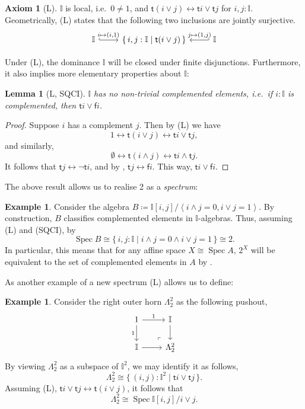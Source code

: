 \documentclass[a4paper,12pt]{amsart}
\newtheorem{lemma}[theorem]{Lemma}
\theoremstyle{definition}
\newtheorem{example}[theorem]{Example}
\newtheorem*{axiom}{Axiom}
\newcommand{\mbb}[1]{\mathbb{#1}}
\newcommand{\I}{\mbb I}
\newcommand{\ms}[1]{\mathsf{#1}}
\newcommand{\pair}[1]{\left\langle#1\right\rangle}
\newcommand{\scomp}[2]{\{\,#1\mid#2\,\}}
\newcommand{\emp}{\emptyset}
\newcommand{\eq}{\leftrightarrow}
\newcommand{\spec}{\operatorname{Spec}}
\begin{document}
\begin{axiom}[L]\label{ax:L}
  $\I$ is local, i.e.\ $0 \neq 1$, and $\ms t(i\vee j) \eq \ms ti \vee \ms tj$ for $i,j : \I$. Geometrically, (L) states that the following two inclusions are jointly surjective.
  \[ 
  \begin{tikzcd}
    \I \ar[r, hook, "{i \mapsto (i,1)}"] & \scomp{i,j : \I}{\ms t(i\vee j)} & \I \ar[l, hook', "{j \mapsto (1,j)}"']
  \end{tikzcd}
  \]
\end{axiom}

Under (L), the dominance $\I$ will be closed under finite disjunctions. Furthermore, it also implies more elementary properties about $\I$:

\begin{lemma}[L, SQCI]\label{lem:intisnotBoolean}
  $\I$ has no non-trivial complemented elements, i.e.\ if $i : \I$ is complemented, then $\ms ti \vee \ms fi$. 
\end{lemma}
\begin{proof}
  Suppose $i$ has a complement $j$. Then by (L) we have
  \[ 1 \eq \ms t(i \vee j) \eq \ms ti \vee \ms tj, \]
  and similarly,
  \[ \emp \eq \ms t(i \wedge j) \eq \ms ti \wedge \ms tj. \]
  It follows that $\ms tj \eq \neg \ms ti$, and by , $\ms tj \eq \ms fi$. This way, $\ms ti \vee \ms fi$.
\end{proof}

The above result allows us to realise 2 as a \emph{spectrum}:

\begin{example}\label{exm:2isaffine}
  Consider the algebra $B \coloneq \I[i,j]/\pair{i\wedge j =0,i\vee j = 1}$. By construction, $B$ classifies complemented elements in $\I$-algebras. Thus, assuming (L) and (SQCI), by 
  \[ \spec B \cong \scomp{i,j : \I}{i \wedge j = 0 \wedge i \vee j = 1} \cong 2. \]
  In particular, this means that for any affine space $X \cong \spec A$, $2^X$ will be equivalent to the set of complemented elements in $A$ by .
\end{example}

As another example of a new spectrum (L) allows us to define:

\begin{example}\label{exm:hornaffine}
  Consider the right outer horn $\Lambda^2_2$ as the following pushout,
  \[
    \begin{tikzcd}
      1 \ar[d, "1"'] \ar[r, "1"] & \I \ar[d] \\
      \I \ar[r] & \Lambda^2_2
      \arrow["\lrcorner"{anchor=center, pos=0.125, rotate=180}, draw=none, from=2-2, to=1-1]
    \end{tikzcd}
  \]
  By viewing $\Lambda^2_2$ as a subspace of $\I^2$, we may identify it as follows,
  \[ \Lambda^2_2 \cong \scomp{(i,j) : \I^2}{\ms ti \vee \ms tj}. \]
  Assuming (L), $\ms ti \vee \ms tj \eq \ms t(i\vee j)$, it follows that 
  \[ \Lambda^2_2 \cong \spec \I[i,j]/i \vee j. \]
\end{example}
\end{document}

